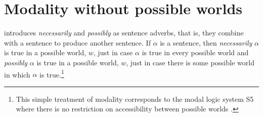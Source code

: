 





\section{Modality without possible worlds}

\cite{Montague1973} introduces \textit{necessarily} and
\textit{possibly} as sentence adverbs, that is, they combine with a
sentence to produce another sentence. If $\alpha$ is a sentence, then
\textit{necessarily} $\alpha$ is true in a possible world, $w$, just in case $\alpha$ is true in
every possible world and \textit{possibly} $\alpha$ is true in a
possible world, $w$, just in case there is some possible world in
which $\alpha$ is true.\footnote{This simple treatment of modality
  corresponds to the modal logic system S5 where there is no
  restriction on accessibility between possible worlds
  \citep{HughesCresswel1968,HughesCresswell1996}.}


